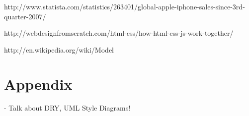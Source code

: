 \documentclass[a4paper,11pt,twoside]{article}
\begin{document}
\newpage

\begin{thebibliography}{1}


http://www.statista.com/statistics/263401/global-apple-iphone-sales-since-3rd-quarter-2007/

http://webdesignfromscratch.com/html-css/how-html-css-js-work-together/

http://en.wikipedia.org/wiki/Model%

\end{thebibliography}

\newpage

\section{Appendix}



- Talk about DRY, UML Style Diagrams!
\end{document}
